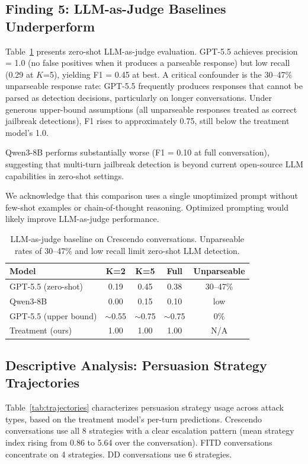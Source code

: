 \documentclass[11pt]{article}
\begin{document}
\subsection{Finding 5: LLM-as-Judge Baselines Underperform}

Table~\ref{tab:llm_judge} presents zero-shot LLM-as-judge evaluation. GPT-5.5 achieves precision = 1.0 (no false positives when it produces a parseable response) but low recall (0.29 at $K$=5), yielding F1 = 0.45 at best. A critical confounder is the 30--47\% unparseable response rate: GPT-5.5 frequently produces responses that cannot be parsed as detection decisions, particularly on longer conversations. Under generous upper-bound assumptions (all unparseable responses treated as correct jailbreak detections), F1 rises to approximately 0.75, still below the treatment model's 1.0.

Qwen3-8B performs substantially worse (F1 = 0.10 at full conversation), suggesting that multi-turn jailbreak detection is beyond current open-source LLM capabilities in zero-shot settings.

We acknowledge that this comparison uses a single unoptimized prompt without few-shot examples or chain-of-thought reasoning. Optimized prompting would likely improve LLM-as-judge performance.

\begin{table}[t]
\centering
\caption{LLM-as-judge baseline on Crescendo conversations. Unparseable rates of 30--47\% and low recall limit zero-shot LLM detection.}
\label{tab:llm_judge}
\begin{tabular}{lcccc}
\toprule
\textbf{Model} & \textbf{K=2} & \textbf{K=5} & \textbf{Full} & \textbf{Unparseable} \\
\midrule
GPT-5.5 (zero-shot) & 0.19 & 0.45 & 0.38 & 30--47\% \\
Qwen3-8B & 0.00 & 0.15 & 0.10 & low \\
GPT-5.5 (upper bound) & $\sim$0.55 & $\sim$0.75 & $\sim$0.75 & 0\% \\
Treatment (ours) & 1.00 & 1.00 & 1.00 & N/A \\
\bottomrule
\end{tabular}
\end{table}

\subsection{Descriptive Analysis: Persuasion Strategy Trajectories}

Table~\ref{tab:trajectories} characterizes persuasion strategy usage across attack types, based on the treatment model's per-turn predictions. Crescendo conversations use all 8 strategies with a clear escalation pattern (mean strategy index rising from 0.86 to 5.64 over the conversation). FITD conversations concentrate on 4 strategies. DD conversations use 6 strategies.
\end{document}
